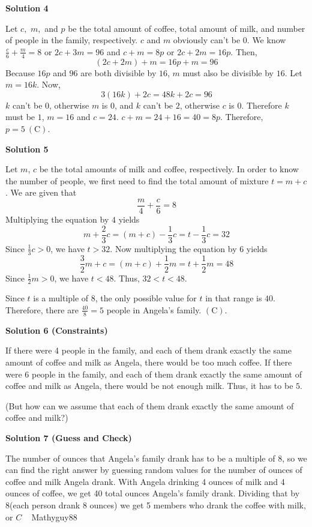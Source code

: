 \begin{enumerate}
 



\textbf{Solution 4}

Let $c,$ $m,$ and $p$ be the total amount of coffee, total amount of milk, and number of people in the family, respectively. $c$ and $m$ obviously can't be $0$. We know $\frac{c}{6} + \frac{m}{4} = 8$ or $2c + 3m = 96$ and $c + m = 8p$ or $2c + 2m = 16p$. Then, 
 \[(2c + 2m) + m = 16p + m = 96\]Because $16p$ and $96$ are both divisible by $16$, $m$ must also be divisible by $16$. Let $m = 16k$. Now, 
 \[3(16k) + 2c = 48k + 2c = 96\] $k$ can't be $0$, otherwise $m$ is $0$, and $k$ can't be $2$, otherwise $c$ is $0$. Therefore $k$ must be $1$, $m = 16$ and $c = 24$. $c + m = 24 + 16 = 40 = 8p$. Therefore, $p = 5\ \mathrm{(C)}$.

 



\textbf{Solution 5}

Let $m$, $c$ be the total amounts of milk and coffee, respectively. In order to know the number of people, we first need to find the total amount of mixture $t = m + c$. We are given that 
 \[\frac{m}{4} + \frac{c}{6} = 8\]Multiplying the equation by $4$ yields 
 \[m + \frac{2}{3}c = (m + c) - \frac{1}{3}c = t - \frac{1}{3}c = 32\]Since $\frac{1}{3}c > 0$, we have $t > 32$. Now multiplying the equation by $6$ yields 
 \[\frac{3}{2}m + c = (m+c) + \frac{1}{2}m = t + \frac{1}{2}m = 48\]Since $\frac{1}{2}m > 0$, we have $t < 48$. Thus, $32 < t < 48$.

 Since $t$ is a multiple of $8$, the only possible value for $t$ in that range is $40$. Therefore, there are $\frac{40}{8} = 5$ people in Angela's family. $\mathrm{(C)}$.

 



\textbf{Solution 6 (Constraints)}

If there were 4 people in the family, and each of them drank exactly the same amount of coffee and milk as Angela, there would be too much coffee. If there were 6 people in the family, and each of them drank exactly the same amount of coffee and milk as Angela, there would be not enough milk. Thus, it has to be $\boxed{5}$.

 (But how can we assume that each of them drank exactly the same amount of coffee and milk?)

 



\textbf{Solution 7 (Guess and Check)}

The number of ounces that Angela's family drank has to be a multiple of 8, so we can find the right answer by guessing random values for the number of ounces of coffee and milk Angela drank. With Angela drinking 4 ounces of milk and 4 ounces of coffee, we get 40 total ounces Angela's family drank. Dividing that by 8(each person drank 8 ounces) we get 5 members who drank the coffee with milk, or $\boxed{C}$  ~ Mathyguy88


\end{enumerate}
